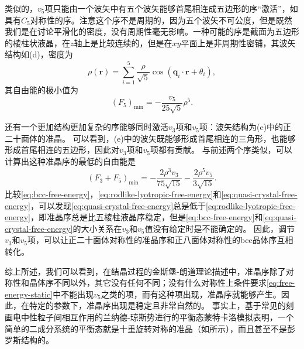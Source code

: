 \documentclass[hyperref, UTF8, a4paper]{ctexart}
\begin{document}
类似的，$v_5$项只能由一个波矢中有五个波矢能够首尾相连成五边形的序“激活”，如具有$C_5$对称性的序。注意这个序不是周期的，因为五个波矢不可公度，但是既然我们是在讨论平滑化的密度，没有周期性毫无影响。一种可能的序是截面为五边形的棱柱状液晶，在$z$轴上是比较连续的，但是在$xy$平面上是非周期性密铺，其波矢结构如(d)，密度为
\begin{equation}
    \rho(\boldsymbol{r})=\sum_{i=1}^{5} \frac{\rho}{\sqrt{5}} \cos \left(\boldsymbol{q}_{i} \cdot \boldsymbol{r}+\theta_{i}\right),
\end{equation}
其自由能的极小值为
\begin{equation}
    (F_{5})_\text{min} =-\frac{v_{5}}{25 \sqrt{5}} \rho^{5}.
    \label{eq:rodlike-lyotropic-free-energy}
\end{equation}

还有一个更加结构更加复杂的序能够同时激活$v_3$项和$v_5$项：波矢结构为(e)中的正二十面体的准晶。
可以看到，(e)中的波矢既能够形成首尾相连的三角形，也能够形成首尾相连的五边形，因此对$v_3$项和$v_5$项都有贡献。
与前述两个序类似，可以计算出这种准晶序的最低的自由能是
\begin{equation}
    \left(F_{3}+F_{5}\right)_{\min }=-\frac{2 \rho^{3} v_{3}}{75 \sqrt{15}}-\frac{2 \rho^{5} v_{5}}{3 \sqrt{15}}.
    \label{eq:quasi-crystal-free-energy}
\end{equation}
比较\eqref{eq:bcc-free-energy}，\eqref{eq:rodlike-lyotropic-free-energy}和\eqref{eq:quasi-crystal-free-energy}，可以发现\eqref{eq:quasi-crystal-free-energy}总是低于\eqref{eq:rodlike-lyotropic-free-energy}，即准晶序总是比五棱柱液晶序稳定，但是\eqref{eq:bcc-free-energy}和\eqref{eq:quasi-crystal-free-energy}的大小关系在$v_3$和$v_5$值没有给定时是不能确定的。
因此，调节$v_3$和$v_5$项，可以让正二十面体对称性的准晶序和正八面体对称性的bcc晶体序互相转化。

综上所述，我们可以看到，在结晶过程的金斯堡-朗道理论描述中，准晶序除了对称性和晶体序不同以外，其它没有任何不同；没有什么对称性上条件要求\eqref{eq:free-energy-static}中不能出现$v_5$之类的项，而有这种项出现，准晶序就能够产生。因此，在特定的参数下，准晶序出现是稳定且非常自然的。
事实上，基于常见的刻画电中性粒子间相互作用的兰纳德-琼斯势进行的平衡态蒙特卡洛模拟表明，一个简单的二成分系统的平衡态就是十重旋转对称的准晶（如所示），而且甚至不是彭罗斯结构的\cite{PhysRevLett.58.706}。
\end{document}
